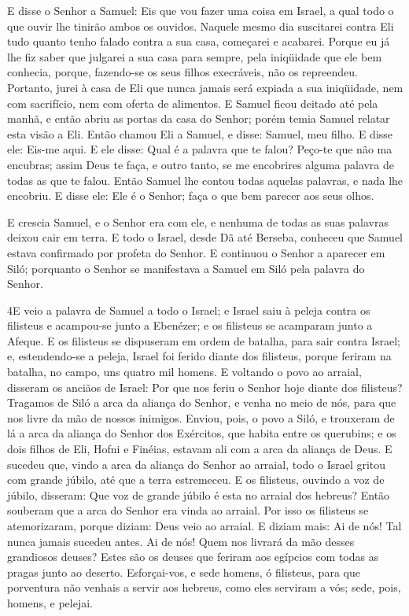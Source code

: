 E disse o Senhor a Samuel: Eis que vou fazer uma coisa em Israel,
a qual todo o que ouvir lhe tinirão ambos os ouvidos. Naquele
mesmo dia suscitarei contra Eli tudo quanto tenho falado contra a
sua casa, começarei e acabarei. Porque eu já lhe fiz saber
que julgarei a sua casa para sempre, pela iniqüidade que ele bem
conhecia, porque, fazendo-se os seus filhos execráveis, não os
repreendeu. Portanto, jurei à casa de Eli que nunca jamais
será expiada a sua iniqüidade, nem com sacrifício, nem com oferta de
alimentos. E Samuel ficou deitado até pela manhã, e então
abriu as portas da casa do Senhor; porém temia Samuel relatar esta
visão a Eli. Então chamou Eli a Samuel, e disse: Samuel, meu
filho. E disse ele: Eis-me aqui. E ele disse: Qual é a
palavra que te falou? Peço-te que não ma encubras; assim Deus te
faça, e outro tanto, se me encobrires alguma palavra de todas as que
te falou. Então Samuel lhe contou todas aquelas palavras, e
nada lhe encobriu. E disse ele: Ele é o Senhor; faça o que bem
parecer aos seus olhos.

E crescia Samuel, e o Senhor era com ele, e nenhuma de todas as
suas palavras deixou cair em terra. E todo o Israel, desde Dã
até Berseba, conheceu que Samuel estava confirmado por profeta do
Senhor. E continuou o Senhor a aparecer em Siló; porquanto o
Senhor se manifestava a Samuel em Siló pela palavra do Senhor.

\medskip

\lettrine{4} E veio a palavra de Samuel a todo o Israel; e
Israel saiu à peleja contra os filisteus e acampou-se junto a
Ebenézer; e os filisteus se acamparam junto a Afeque. E os
filisteus se dispuseram em ordem de batalha, para sair contra
Israel; e, estendendo-se a peleja, Israel foi ferido diante dos
filisteus, porque feriram na batalha, no campo, uns quatro mil
homens. E voltando o povo ao arraial, disseram os anciãos de
Israel: Por que nos feriu o Senhor hoje diante dos filisteus?
Tragamos de Siló a arca da aliança do Senhor, e venha no meio de
nós, para que nos livre da mão de nossos inimigos. Enviou, pois,
o povo a Siló, e trouxeram de lá a arca da aliança do Senhor dos
Exércitos, que habita entre os querubins; e os dois filhos de Eli,
Hofni e Finéias, estavam ali com a arca da aliança de Deus. E
sucedeu que, vindo a arca da aliança do Senhor ao arraial, todo o
Israel gritou com grande júbilo, até que a terra estremeceu. E
os filisteus, ouvindo a voz de júbilo, disseram: Que voz de grande
júbilo é esta no arraial dos hebreus? Então souberam que a arca do
Senhor era vinda ao arraial. Por isso os filisteus se
atemorizaram, porque diziam: Deus veio ao arraial. E diziam mais: Ai
de nós! Tal nunca jamais sucedeu antes. Ai de nós! Quem nos
livrará da mão desses grandiosos deuses? Estes são os deuses que
feriram aos egípcios com todas as pragas junto ao deserto.
Esforçai-vos, e sede homens, ó filisteus, para que porventura
não venhais a servir aos hebreus, como eles serviram a vós; sede,
pois, homens, e pelejai.

